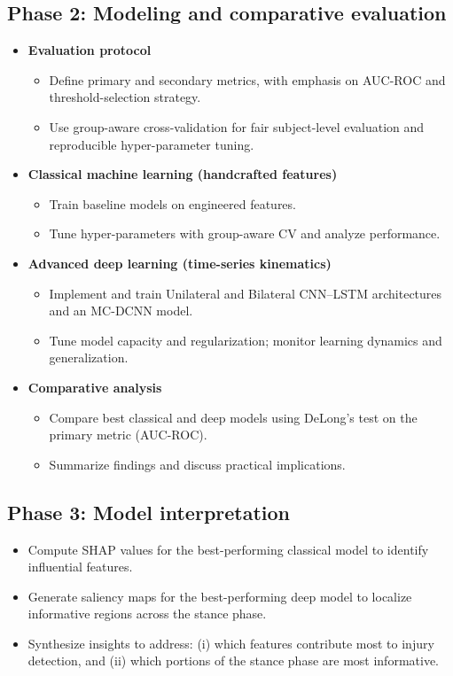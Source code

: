 \subsection{Phase 2: Modeling and comparative evaluation}
\begin{itemize}
    \item \textbf{Evaluation protocol}
    \begin{itemize}
        \item Define primary and secondary metrics, with emphasis on AUC-ROC and threshold-selection strategy.
        \item Use group-aware cross-validation for fair subject-level evaluation and reproducible hyper-parameter tuning.
    \end{itemize}
    \item \textbf{Classical machine learning (handcrafted features)}
    \begin{itemize}
        \item Train baseline models on engineered features.
        \item Tune hyper-parameters with group-aware CV and analyze performance.
    \end{itemize}
    \item \textbf{Advanced deep learning (time-series kinematics)}
    \begin{itemize}
        \item Implement and train Unilateral and Bilateral CNN--LSTM architectures and an MC-DCNN model.
        \item Tune model capacity and regularization; monitor learning dynamics and generalization.
    \end{itemize}
    \item \textbf{Comparative analysis}
    \begin{itemize}
        \item Compare best classical and deep models using DeLong's test on the primary metric (AUC-ROC).
        \item Summarize findings and discuss practical implications.
    \end{itemize}
\end{itemize}

\subsection{Phase 3: Model interpretation}
\begin{itemize}
    \item Compute SHAP values for the best-performing classical model to identify influential features.
    \item Generate saliency maps for the best-performing deep model to localize informative regions across the stance phase.
    \item Synthesize insights to address: (i) which features contribute most to injury detection, and (ii) which portions of the stance phase are most informative.
\end{itemize}


